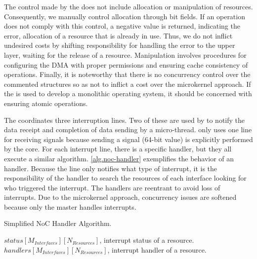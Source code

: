 			The control made by the \hypervisor does not include allocation or manipulation of resources. Consequently, we manually control allocation through bit fields. If an operation does not comply with this control, a negative value is returned, indicating the error, \eg allocation of a resource that is already in use. Thus, we do not inflict undesired costs by shifting responsibility for handling the error to the upper layer, \eg waiting for the release of a resource. Manipulation involves procedures for configuring the DMA with proper permissions and ensuring cache consistency of operations. Finally, it is noteworthy that there is no concurrency control over the commented structures so as not to inflict a cost over the microkernel approach. If the \nanvix \hal is used to develop a monolithic operating system, it should be concerned with ensuring atomic operations.

			The \dma coordinates three interruption lines. Two of these are used by \dnoc to notify the data receipt and completion of data sending by a micro-thread. \cnoc only uses one line for receiving signals because sending a signal (64-bit value) is explicitly performed by the core. For each interrupt line, there is a specific handler, but they all execute a similar algorithm. \autoref{alg.noc-handler} exemplifies the behavior of an \noc handler. Because the line only notifies what type of interrupt, it is the responsibility of the handler to search the resources of each interface looking for who triggered the interrupt. The handlers are reentrant to avoid loss of interrupts. Due to the microkernel approach, concurrency issues are softened because only the master handles interrupts.

			\begin{algorithm}
				\caption{Simplified NoC Handler Algorithm.}%
				\label{alg.noc-handler}%
				\begin{algorithmic}[1]
					\Require $status[M_{Interfaces}][N_{Resources}]$, interrupt status of a resource.
					\Require $handlers[M_{Interfaces}][N_{Resources}]$, interrupt handler of a resource.
							\EndIf
						\EndFor
					\EndFor
					\EndProcedure
				\end{algorithmic}%
			\end{algorithm}

